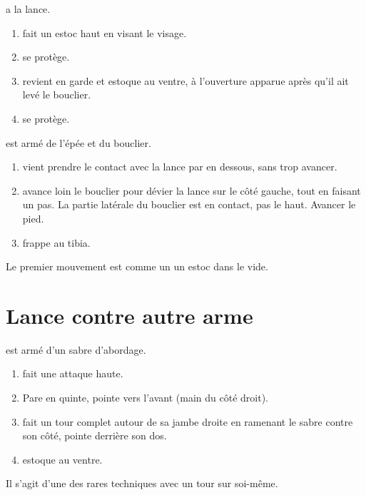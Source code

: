 \begin{exercice}
\A a la lance.

\begin{enumerate}
	\item \A fait un estoc haut en visant le visage.
	
	\item \D se protège.
	
	\item \A revient en garde et estoque \D au ventre, à l'ouverture apparue après qu'il ait levé le bouclier.
	
	\item \D se protège.
\end{enumerate}

\end{exercice}


\begin{technique}
\A est armé de l'épée et du bouclier.

\begin{enumerate}
	\item \A vient prendre le contact avec la lance par en dessous, sans trop avancer.
	
	\item \A avance loin le bouclier pour dévier la lance sur le côté gauche, tout en faisant un pas.
	La partie latérale du bouclier est en contact, pas le haut.
	Avancer le pied.

	\item \A frappe \D au tibia.
\end{enumerate}

Le premier mouvement est comme un un estoc dans le vide.

\end{technique}


\section{Lance contre autre arme}


\begin{technique}
\D est armé d'un sabre d'abordage.

\begin{enumerate}
	\item \A fait une attaque haute.
	
	\item \D Pare en quinte, pointe vers l'avant (main du côté droit).
	
	\item \D fait un tour complet autour de sa jambe droite en ramenant le sabre contre son côté, pointe derrière son dos.
	
	\item \D estoque \A au ventre.
\end{enumerate}

Il s'agit d'une des rares techniques avec un tour sur soi-même.

\end{technique}


